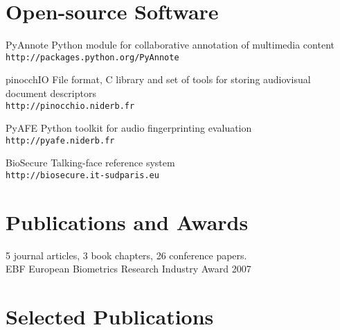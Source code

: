\documentclass{simplecv}
\begin{document}
\section{Open-source Software}
\begin{topic}
\item[PyAnnote] Python module for collaborative annotation of multimedia content\\
\texttt{\small http://packages.python.org/PyAnnote}
\item[pinocchIO] File format, C library and set of tools for storing audiovisual document descriptors\\
\texttt{\small http://pinocchio.niderb.fr}
\item[PyAFE] Python toolkit for audio fingerprinting evaluation~\cite{Ramona2011}\\
\texttt{\small http://pyafe.niderb.fr}
\item[BioSecure] Talking-face reference system~\cite{Bredin2006a}\\
\texttt{\small http://biosecure.it-sudparis.eu}
\end{topic}

\section{Publications and Awards}

5 journal articles, 3 book chapters, 26 conference papers.\\
EBF European Biometrics Research Industry Award 2007~\cite{Bredin2008}

\section{Selected Publications}
\nocite{Bredin2012,Bredin2012a,Ramona2011,Bredin2009,Bredin2008,Bredin2007,Argones-Rua2007a,Bredin2006a}


\end{document}
